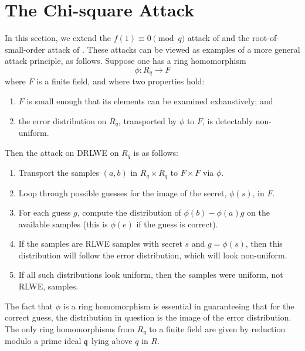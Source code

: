 \documentclass[envcountsame]{llncs}
\begin{document}
\section{The Chi-square Attack}
\label{sec: chi-square}

In this section, we extend the $f(1) \equiv 0 \pmod q$ attack of \cite{eisentrager2014weak} and the root-of-small-order attack of \cite{elos2015weak}.  These attacks can be viewed as examples of a more general attack principle, as follows.  Suppose one has a ring homomorphism
\[
        \phi: R_q \rightarrow F
\]
where $F$ is a finite field, and where two properties hold:
\begin{enumerate}
        \item $F$ is small enough that its elements can be examined exhaustively; and
        \item the error distribution on $R_q$, transported by $\phi$ to $F$, is detectably non-uniform.
\end{enumerate}

Then the attack on DRLWE on $R_q$ is as follows:
\begin{enumerate}
        \item Transport the samples $(a, b)$ in $R_q \times R_q$ to $F \times F$ via $\phi$.
        \item Loop through possible guesses for the image of the secret, $\phi(s)$, in $F$.
        \item For each guess $g$, compute the distribution of $\phi(b) - \phi(a)g$ on the available samples (this is $\phi(e)$ if the guess is correct).
        \item If the samples are RLWE samples with secret $s$ and $g = \phi(s)$, then this distribution will follow the error distribution, which will look non-uniform.
        \item If all such distributions look uniform, then the samples were uniform, not RLWE, samples.
\end{enumerate}

The fact that $\phi$ is a ring homomorphism is essential in guaranteeing that for the correct guess, the distribution in question is the image of the error distribution.  The only ring homomorphisms from $R_q$ to a finite field are given by reduction modulo a prime ideal $\mathfrak{q}$ lying above $q$ in $R$.
\end{document}
